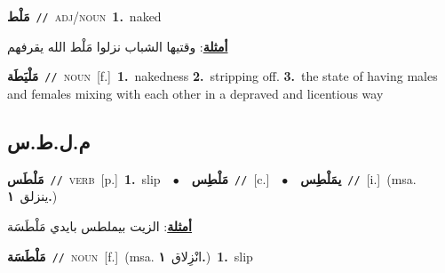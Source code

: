 \documentclass[10pt,a4paper,twoside]{article} %
\begin{document}
\begin{multicols}{2}
{\setlength\topsep{0pt}\textbf{\foreignlanguage{arabic}{مَلْط}}\ {\color{gray}\texttt{//}\color{black}}\ \textsc{adj/noun}\ \textbf{1.}~naked\  \begin{flushright}\color{gray}\foreignlanguage{arabic}{\textbf{\underline{\foreignlanguage{arabic}{أمثلة}}}: وقتيها الشباب نزلوا مَلْط الله يقرفهم}\end{flushright}\color{black}} \vspace{2mm}

{\setlength\topsep{0pt}\textbf{\foreignlanguage{arabic}{مَلْيَطَة}}\ {\color{gray}\texttt{//}\color{black}}\ \textsc{noun}\ [f.]\ \textbf{1.}~nakedness  \textbf{2.}~stripping off.  \textbf{3.}~the state of having males and females mixing with each other in a depraved and licentious way\ } \vspace{2mm}

\vspace{-3mm}
\subsection*{\color{blue}\foreignlanguage{arabic}{م.ل.ط.س}\color{blue}{}} 

{\setlength\topsep{0pt}\textbf{\foreignlanguage{arabic}{مَلْطَس}}\ {\color{gray}\texttt{//}\color{black}}\ \textsc{verb}\ [p.]\ \textbf{1.}~slip\ \ $\bullet$\ \ \setlength\topsep{0pt}\textbf{\foreignlanguage{arabic}{مَلْطِس}}\ {\color{gray}\texttt{//}\color{black}}\ [c.]\ \ $\bullet$\ \ \setlength\topsep{0pt}\textbf{\foreignlanguage{arabic}{يمَلْطِس}}\ {\color{gray}\texttt{//}\color{black}}\ [i.]\ \color{gray}(msa. \foreignlanguage{arabic}{ينزلق}~\foreignlanguage{arabic}{\textbf{١.}})\color{black}\  \begin{flushright}\color{gray}\foreignlanguage{arabic}{\textbf{\underline{\foreignlanguage{arabic}{أمثلة}}}: الزيت بيملطس بايدي مَلْطَسَة}\end{flushright}\color{black}} \vspace{2mm}

{\setlength\topsep{0pt}\textbf{\foreignlanguage{arabic}{مَلْطَسَة}}\ {\color{gray}\texttt{//}\color{black}}\ \textsc{noun}\ [f.]\ \color{gray}(msa. \foreignlanguage{arabic}{انْزِلاق}~\foreignlanguage{arabic}{\textbf{١.}})\color{black}\ \textbf{1.}~slip\ } \vspace{2mm}


\end{multicols}
\end{document}
